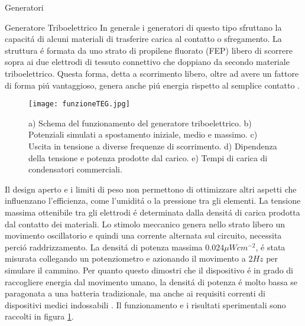 \begin{section}{Generatori}
    \begin{subsection}{Generatore Triboelettrico}
        In generale i generatori di questo tipo sfruttano la capacit\'a di alcuni materiali di trasferire carica al contatto o sfregamento. La struttura \'e formata da uno strato di propilene fluorato (FEP) libero di scorrere sopra ai due elettrodi di tessuto connettivo che doppiano da secondo materiale triboelettrico. Questa forma, detta a scorrimento libero, oltre ad avere un fattore di forma pi\'u vantaggioso, genera anche pi\'u energia rispetto al semplice contatto \cite{fuAchievingUltraDurabilityHigh2024}. 
        \begin{figure}[H]
            \texttt{[image: funzioneTEG.jpg]}
            \centering
            \caption{a) Schema del funzionamento del generatore triboelettrico. b) Potenziali simulati a spostamento iniziale, medio e massimo. c) Uscita in tensione a diverse frequenze di scorrimento. d) Dipendenza della tensione e potenza prodotte dal carico. e) Tempi di carica di condensatori commerciali.\cite{kouWearableAllFabricHybrid2024}}
            \label{fig:funzioneTEG}
        \end{figure}
        Il design aperto e i limiti di peso non permettono di ottimizzare altri aspetti che influenzano l'efficienza, come l'umidit\'a o la pressione tra gli elementi. La tensione massima ottenibile tra gli elettrodi \'e determinata dalla densit\'a di carica prodotta dal contatto dei materiali. Lo stimolo meccanico genera nello strato libero un movimento oscillatorio e quindi una corrente alternata sul circuito, necessita perci\'o raddrizzamento. La densit\'a di potenza massima \(0.024\mu Wcm^{-2}\), \'e stata misurata collegando un potenziometro e azionando il movimento a \(2Hz\) per simulare il cammino. Per quanto questo dimostri che il dispositivo \'e in grado di raccogliere energia dal movimento umano, la densit\'a di potenza \'e molto bassa se paragonata a una batteria tradizionale, ma anche ai requisiti correnti di dispositivi medici indossabili \cite{gaoAdvancedEnergyHarvesters2024}. Il funzionamento e i risultati sperimentali sono raccolti in figura \ref{fig:funzioneTEG}.
        
    \end{subsection}
    

\end{section}
